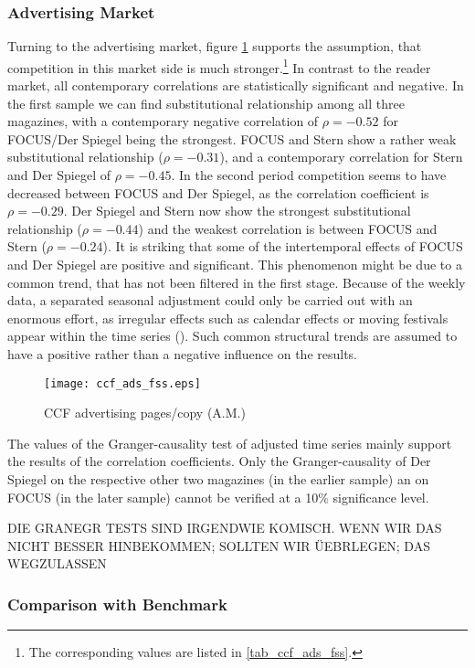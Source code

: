 \documentclass[12pt,a4paper]{scrreprt}
\begin{document}
\subsubsection{Advertising Market}
Turning to the advertising market, figure \ref{fig_ccf_ads_fss} supports the assumption, that competition in this market side is much stronger.\footnote{The corresponding values are listed in \ref{tab_ccf_ads_fss}.} In contrast to the reader market, all contemporary correlations are statistically significant and negative. In the first sample we can find substitutional relationship among all three magazines, with a contemporary negative correlation of $\rho=-0.52$ for FOCUS/Der Spiegel being the strongest. FOCUS and Stern show a rather weak substitutional relationship ($\rho=-0.31$), and a contemporary correlation for Stern and Der Spiegel of $\rho=-0.45$. In the second period competition seems to have decreased between FOCUS and Der Spiegel, as the correlation coefficient is $\rho=-0.29$. Der Spiegel and Stern now show the strongest substitutional relationship ($\rho=-0.44$) and the weakest correlation is between FOCUS and Stern ($\rho=-0.24$). It is striking that some of the intertemporal effects of FOCUS and Der Spiegel are positive and significant. This phenomenon might be due to a common trend, that has not been filtered in the first stage. Because of the weekly data, a separated seasonal adjustment could only be carried out with an enormous effort, as irregular effects such as calendar effects or moving festivals appear within the time series (\cite{harvey_modeling_1997}). Such common structural trends are assumed to have a positive rather than a negative influence on the results. 

\begin{figure}[H]
\caption{CCF advertising pages/copy (A.M.)}
	\centering
	\texttt{[image: ccf\_ads\_fss.eps]}
	\label{fig_ccf_ads_fss}
\end{figure}

The values of the Granger-causality test of adjusted time series mainly support the results of the correlation coefficients. Only the Granger-causality of Der Spiegel on the respective other two magazines (in the earlier sample) an on FOCUS (in the later sample) cannot be verified at a 10$\%$ significance level. 

\textcolor[rgb]{1,0.41,0.13}{DIE GRANEGR TESTS SIND IRGENDWIE KOMISCH. WENN WIR DAS NICHT BESSER HINBEKOMMEN; SOLLTEN WIR ÜEBRLEGEN; DAS WEGZULASSEN
}


\subsubsection{Comparison with Benchmark}
\end{document}
